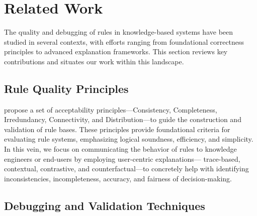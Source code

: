 \section{Related Work}
\label{sec:related-work}

The quality and debugging of rules in knowledge-based systems have been studied in several contexts, with efforts ranging from foundational correctness principles to advanced explanation frameworks. This section reviews key contributions and situates our work within this landscape.

\subsection{Rule Quality Principles}

\citet{landauer1990correctness} propose a set of acceptability principles—Consistency, Completeness, Irredundancy, Connectivity, and Distribution—to guide the construction and validation of rule bases. These principles provide foundational criteria for evaluating rule systems, emphasizing logical soundness, efficiency, and simplicity. 
In this vein, we focus on communicating the behavior of rules to knowledge engineers or end-users by employing user-centric explanations— trace-based, contextual, contrastive, and counterfactual—to concretely help with identifying inconsistencies, incompleteness, accuracy, and fairness of decision-making.


\subsection{Debugging and Validation Techniques}

